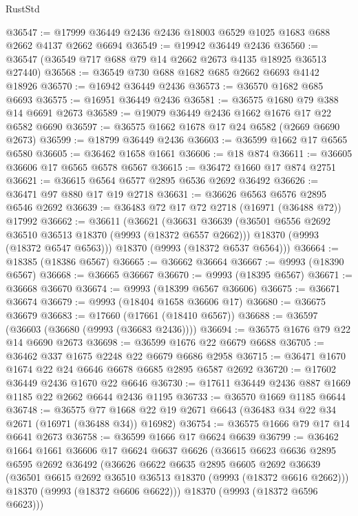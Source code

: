 \begin{lexlean}{RustStd}
\begin{coremodule}
@36547 := @17999 @36449 @2436 @2436 @18003 @6529 @1025 @1683 @688 @2662 @4137 @2662 @6694
@36549 := @19942 @36449 @2436
@36560 := @36547 (@36549 @717 @688 @79 @14 @2662 @2673 @4135 @18925 @36513 @27440)
@36568 := @36549 @730 @688 @1682 @685 @2662 @6693 @4142 @18926
@36570 := @16942 @36449 @2436
@36573 := @36570 @1682 @685 @6693
@36575 := @16951 @36449 @2436
@36581 := @36575 @1680 @79 @388 @14 @6691 @2673
@36589 := @19079 @36449 @2436 @1662 @1676 @17 @22 @6582 @6690
@36597 := @36575 @1662 @1678 @17 @24 @6582 (@2669 @6690 @2673)
@36599 := @18799 @36449 @2436
@36603 := @36599 @1662 @17 @6565 @6580
@36605 := @36462 @1658 @1661
@36606 := @18 @874
@36611 := @36605 @36606 @17 @6565 @6578 @6567
@36615 := @36472 @1660 @17 @874 @2751
@36621 := @36615 @6564 @6577 @2895 @6536 @2692 @36492
@36626 := @36471 @97 @880 @17 @19 @2718
@36631 := @36626 @6563 @6576 @2895 @6546 @2692
@36639 := @36483 @72 @17 @72 @2718 (@16971 (@36488 @72)) @17992
@36662 := @36611
    (@36621
      (@36631
        @36639
        (@36501 @6556 @2692 @36510 @36513 @18370 (@9993 (@18372 @6557 @2662)))
        @18370
        (@9993 (@18372 @6547 @6563)))
      @18370
      (@9993 (@18372 @6537 @6564)))
@36664 := @18385 (@18386 @6567)
@36665 := @36662 @36664
@36667 := @9993 (@18390 @6567)
@36668 := @36665 @36667
@36670 := @9993 (@18395 @6567)
@36671 := @36668 @36670
@36674 := @9993 (@18399 @6567 @36606)
@36675 := @36671 @36674
@36679 := @9993 (@18404 @1658 @36606 @17)
@36680 := @36675 @36679
@36683 := @17660 (@17661 (@18410 @6567))
@36688 := @36597 (@36603 (@36680 (@9993 (@36683 @2436))))
@36694 := @36575 @1676 @79 @22 @14 @6690 @2673
@36698 := @36599 @1676 @22 @6679 @6688
@36705 := @36462 @337 @1675 @2248 @22 @6679 @6686 @2958
@36715 := @36471 @1670 @1674 @22 @24 @6646 @6678 @6685 @2895 @6587 @2692
@36720 := @17602 @36449 @2436 @1670 @22 @6646
@36730 := @17611 @36449 @2436 @887 @1669 @1185 @22 @2662 @6644 @2436 @1195
@36733 := @36570 @1669 @1185 @6644
@36748 := @36575
    @77
    @1668
    @22
    @19
    @2671
    @6643
    (@36483 @34 @22 @34 @2671 (@16971 (@36488 @34)) @16982)
@36754 := @36575 @1666 @79 @17 @14 @6641 @2673
@36758 := @36599 @1666 @17 @6624 @6639
@36799 := @36462
    @1664
    @1661
    @36606
    @17
    @6624
    @6637
    @6626
    (@36615
      @6623
      @6636
      @2895
      @6595
      @2692
      @36492
      (@36626
        @6622
        @6635
        @2895
        @6605
        @2692
        @36639
        (@36501 @6615 @2692 @36510 @36513 @18370 (@9993 (@18372 @6616 @2662)))
        @18370
        (@9993 (@18372 @6606 @6622)))
      @18370
      (@9993 (@18372 @6596 @6623)))

\end{coremodule}
\end{lexlean}
